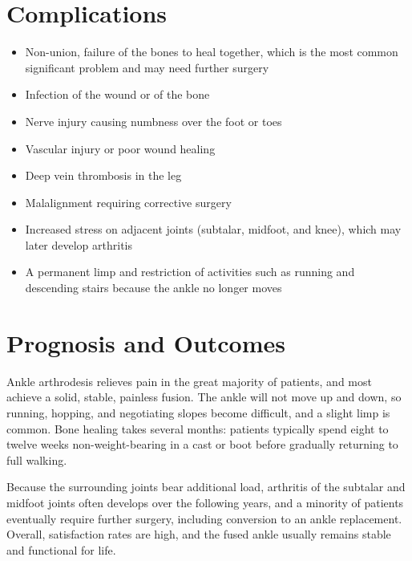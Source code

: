 \section*{Complications}
\begin{itemize}
    \item Non-union, failure of the bones to heal together, which is the most common significant problem and may need further surgery
    \item Infection of the wound or of the bone
    \item Nerve injury causing numbness over the foot or toes
    \item Vascular injury or poor wound healing
    \item Deep vein thrombosis in the leg
    \item Malalignment requiring corrective surgery
    \item Increased stress on adjacent joints (subtalar, midfoot, and knee), which may later develop arthritis
    \item A permanent limp and restriction of activities such as running and descending stairs because the ankle no longer moves
\end{itemize}

\section*{Prognosis and Outcomes}
Ankle arthrodesis relieves pain in the great majority of patients, and most achieve a solid, stable, painless fusion. The ankle will not move up and down, so running, hopping, and negotiating slopes become difficult, and a slight limp is common. Bone healing takes several months: patients typically spend eight to twelve weeks non-weight-bearing in a cast or boot before gradually returning to full walking.

Because the surrounding joints bear additional load, arthritis of the subtalar and midfoot joints often develops over the following years, and a minority of patients eventually require further surgery, including conversion to an ankle replacement. Overall, satisfaction rates are high, and the fused ankle usually remains stable and functional for life.

